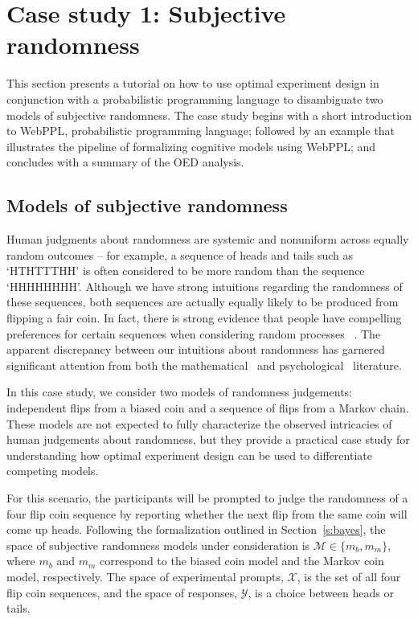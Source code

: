 \documentclass{article}
\begin{document}
\section{Case study 1: Subjective randomness}
\label{s:tutorial}

This section presents a tutorial on how to use optimal experiment design in conjunction with a probabilistic programming language to disambiguate two models of subjective randomness. The case study begins with a short introduction to WebPPL, probabilistic programming language; followed by an example that illustrates the pipeline of formalizing cognitive models using WebPPL; and concludes with a summary of the OED analysis. 

\subsection{Models of subjective randomness}
\label{s:tutorial:ss:randomness}

Human judgments about randomness are systemic and nonuniform across equally random outcomes -- for example, a sequence of heads and tails such as `HTHTTTHH' is often considered to be more random than the sequence `HHHHHHHH'. Although we have strong intuitions regarding the randomness of these sequences, both sequences are actually equally likely to be produced from flipping a fair coin. In fact, there is strong evidence that people have compelling preferences for certain sequences when considering random processes ~\cite{goodfellow38:jep}. The apparent discrepancy between our intuitions about randomness has garnered significant attention from both the mathematical~\cite{chaitin01:er, kac83:as, li97:kca} and psychological~\cite{falk81:pme, lopes82:jep, griffiths01:cogsci} literature. 

In this case study, we consider two models of randomness judgements: independent flips from a biased coin and a sequence of flips from a Markov chain. These models are not expected to fully characterize the observed intricacies of human judgements about randomness, but they provide a practical case study for understanding how optimal experiment design can be used to differentiate competing models. 

For this scenario, the participants will be prompted to judge the randomness of a four flip coin sequence by reporting whether the next flip from the same coin will come up heads. Following the formalization outlined in Section~\ref{s:bayes}, the space of subjective randomness models under consideration is $\mathcal{M} \in \{m_b, m_m\}$, where $m_b$ and $m_m$ correspond to the biased coin model and the Markov coin model, respectively. The space of experimental prompts, $\mathcal{X}$, is the set of all four flip coin sequences, and the space of responses, $\mathcal{Y}$, is a choice between heads or tails.
\end{document}
